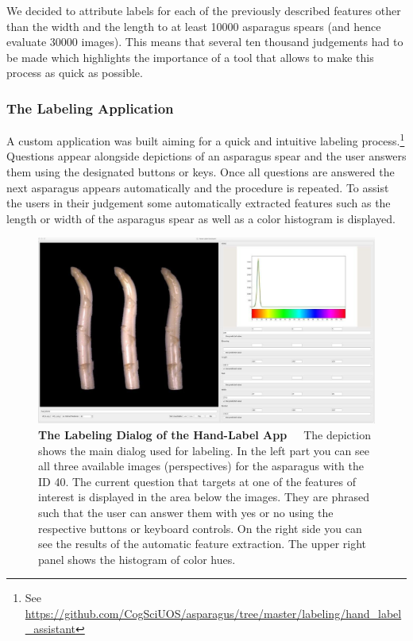 We decided to attribute labels for each of the previously described features other than the width and the length to at least 10000 asparagus spears (and hence evaluate 30000 images). This means that several ten thousand judgements had to be made which highlights the importance of a tool that allows to make this process as quick as possible.


\subsubsection{The Labeling Application}
\label{subsec:LabelApp}

A custom application was built aiming for a quick and intuitive labeling process.\footnote{ See \url{https://github.com/CogSciUOS/asparagus/tree/master/labeling/hand\_label\_assistant}} Questions appear alongside depictions of an asparagus spear and the user answers them using the designated buttons or keys. Once all questions are answered the next asparagus appears automatically and the procedure is repeated. To assist the users in their judgement some automatically extracted features such as the length or width of the asparagus spear as well as a color histogram is displayed.

\begin{figure}[!htb]
	\centering
	\includegraphics[scale=0.3]{Figures/chapter03/labelapp_example.png}
	\decoRule
	\caption[The Labeling Dialog of the Hand-Label App]{\textbf{The Labeling Dialog of the Hand-Label App}~~~The depiction shows the main dialog used for labeling. In the left part you can see all three available images (perspectives) for the asparagus with the ID 40. The current question that targets at one of the features of interest is displayed in the area below the images. They are phrased such that the user can answer them with yes or no using the respective buttons or keyboard controls. On the right side you can see the results of the automatic feature extraction. The upper right panel shows the histogram of color hues.}
	\label{fig:LabelAppGUI}
\end{figure}

